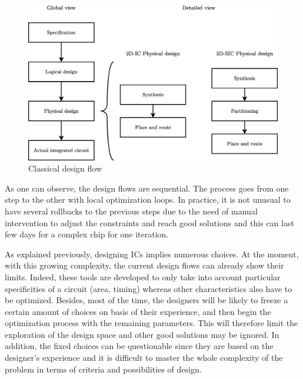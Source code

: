 \begin{figure}[h!]
\begin{center}
\includegraphics[width=\linewidth]{designflow2.eps}
\end{center}
\vspace{-0.5cm}
\caption{Classical design flow}
\label{fig:designflow}
\end{figure}

As one can observe, the design flows are sequential. The process goes from one step to the other with local optimization loops. In practice, it is not unusual to have several rollbacks to the previous steps due to the need of manual intervention to adjust the constraints and reach good solutions and this can last few days for a complex chip for one iteration. %

As explained previously, designing ICs implies numerous choices. At the moment, with this growing complexity, the current design flows can already show their limits. Indeed, these tools are developed to only take into account particular specificities of a circuit (area, timing) whereas other characteristics also have to be optimized. Besides, most of the time, the designers will be likely to freeze a certain amount of choices on basis of their experience, and then begin the optimization process with the remaining parameters. This will therefore limit the exploration of the design space and other good solutions may be ignored. In addition, the fixed choices can be questionable since they are based on the designer's experience and it is difficult to master the whole complexity of the problem in terms of criteria and possibilities of design.

